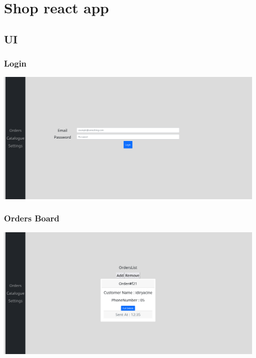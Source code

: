 \documentclass{article}
\begin{document}
\section{Shop react app}

\subsection{UI}

\subsubsection{Login}
\includegraphics[scale=0.25]{./out/ReactApp/Ui/Login/Login.png}

\subsubsection{Orders Board}
\includegraphics[scale=0.25]{./out/ReactApp/Ui/Orders/Orders.png}
\end{document}
